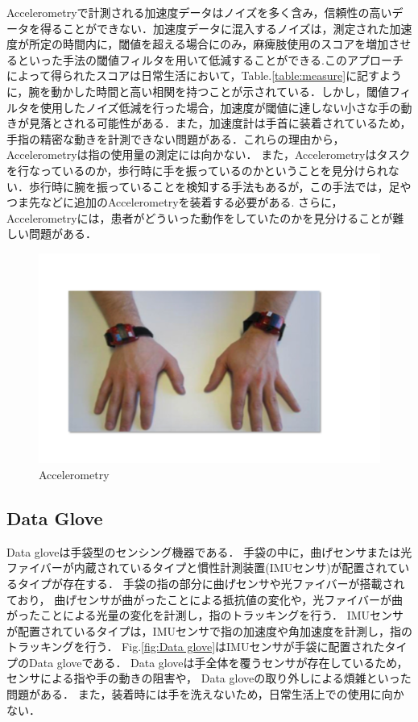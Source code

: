 Accelerometryで計測される加速度データはノイズを多く含み，信頼性の高いデータを得ることができない．加速度データに混入するノイズは，測定された加速度が所定の時間内に，閾値を超える場合にのみ，麻痺肢使用のスコアを増加させるといった手法の閾値フィルタを用いて低減することができる.このアプローチによって得られたスコアは日常生活において，Table.\ref{table:measure}に記すように，腕を動かした時間と高い相関を持つことが示されている．しかし，閾値フィルタを使用したノイズ低減を行った場合，加速度が閾値に達しない小さな手の動きが見落とされる可能性がある．また，加速度計は手首に装着されているため，手指の精密な動きを計測できない問題がある．これらの理由から，Accelerometryは指の使用量の測定には向かない\cite{Uswatte2000}．
また，Accelerometryはタスクを行なっているのか，歩行時に手を振っているのかということを見分けられない．歩行時に腕を振っていることを検知する手法もあるが，この手法では，足やつま先などに追加のAccelerometryを装着する必要がある\cite{Ullery2015}.
さらに，Accelerometryには，患者がどういった動作をしていたのかを見分けることが難しい問題がある\cite{Hayward2016}．
\begin{figure}[H]
  \centering
  \includegraphics[width=0.8\linewidth]{fig/ch1/acc}
  \caption{Accelerometry\cite{Chen2005}}
  \label{fig:Accelerometry}
\end{figure}



\subsection*{Data Glove}
Data glove\cite{Lin2018,Tarchanidis2003}は手袋型のセンシング機器である．
手袋の中に，曲げセンサまたは光ファイバーが内蔵されているタイプと慣性計測装置(IMUセンサ)が配置されているタイプが存在する．
手袋の指の部分に曲げセンサや光ファイバーが搭載されており，
曲げセンサが曲がったことによる抵抗値の変化や，光ファイバーが曲がったことによる光量の変化を計測し，指のトラッキングを行う．
IMUセンサが配置されているタイプは，IMUセンサで指の加速度や角加速度を計測し，指のトラッキングを行う．
Fig.\ref{fig:Data glove}はIMUセンサが手袋に配置されたタイプのData gloveである．
Data gloveは手全体を覆うセンサが存在しているため，センサによる指や手の動きの阻害や，
Data gloveの取り外しによる煩雑といった問題がある．
また，装着時には手を洗えないため，日常生活上での使用に向かない．

